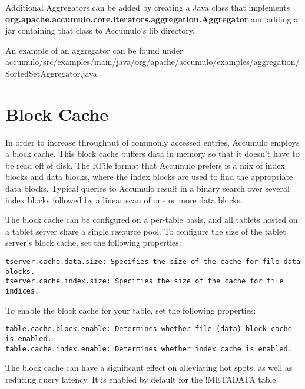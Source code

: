 Additional Aggregators can be added by creating a Java class that implements\\
\textbf{org.apache.accumulo.core.iterators.aggregation.Aggregator} and adding a jar containing that
class to Accumulo's lib directory.

An example of an aggregator can be found under\\
accumulo/src/examples/main/java/org/apache/accumulo/examples/aggregation/SortedSetAggregator.java

\section{Block Cache}

In order to increase throughput of commonly accessed entries, Accumulo employs a block cache.
This block cache buffers data in memory so that it doesn't have to be read off of disk.
The RFile format that Accumulo prefers is a mix of index blocks and data blocks, where the index blocks are used to find the appropriate data blocks.
Typical queries to Accumulo result in a binary search over several index blocks followed by a linear scan of one or more data blocks.

The block cache can be configured on a per-table basis, and all tablets hosted on a tablet server share a single resource pool.
To configure the size of the tablet server's block cache, set the following properties:
\begin{verbatim}
tserver.cache.data.size: Specifies the size of the cache for file data blocks.
tserver.cache.index.size: Specifies the size of the cache for file indices.
\end{verbatim}
To enable the block cache for your table, set the following properties:
\begin{verbatim}
table.cache.block.enable: Determines whether file (data) block cache is enabled.
table.cache.index.enable: Determines whether index cache is enabled.
\end{verbatim}

The block cache can have a significant effect on alleviating hot spots, as well as reducing query latency.
It is enabled by default for the !METADATA table.



